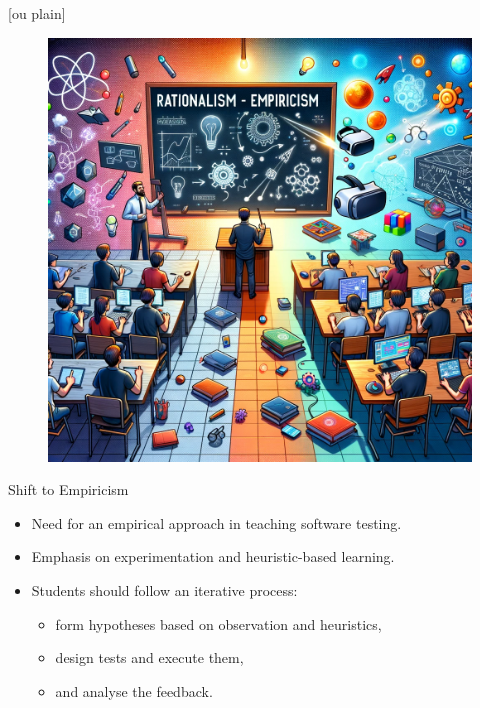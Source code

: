 \documentclass[aspectratio=169]{beamer}
\begin{document}
[ou plain]
\begin{frame}
\begin{figure}
    \centering
    \vspace{-1cm}
    \hspace*{-1.2cm}\includegraphics[width=1.2\linewidth]{images/plaatje.png}
\end{figure}
\end{frame}

\begin{frame}{Shift to Empiricism}
    \begin{itemize}
        \item Need for an empirical approach in teaching software testing.
        \item Emphasis on experimentation and heuristic-based learning.
        \item Students should follow an iterative process:
        \begin{itemize}
            \item form hypotheses based on observation and heuristics, 
            \item design tests and execute them,
            \item and analyse the feedback.
        \end{itemize}
    \end{itemize}
\end{frame}
\end{document}
